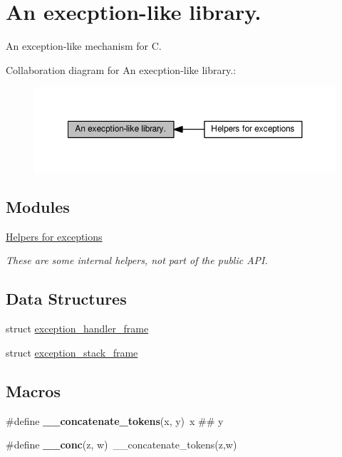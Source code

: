 \hypertarget{group__exceptions}{}\section{An execption-\/like library.}
\label{group__exceptions}


An exception-\/like mechanism for C.  


Collaboration diagram for An execption-\/like library.\+:
\nopagebreak
\begin{figure}[H]
\begin{center}
\leavevmode
\includegraphics[width=350pt]{group__exceptions}
\end{center}
\end{figure}
\subsection*{Modules}
\begin{DoxyCompactItemize}
\item 
\hyperlink{group__helpers}{Helpers for exceptions}
\begin{DoxyCompactList}\small\item\em These are some internal helpers, not part of the public A\+PI. \end{DoxyCompactList}\end{DoxyCompactItemize}
\subsection*{Data Structures}
\begin{DoxyCompactItemize}
\item 
struct \hyperlink{structexception__handler__frame}{exception\+\_\+handler\+\_\+frame}
\item 
struct \hyperlink{structexception__stack__frame}{exception\+\_\+stack\+\_\+frame}
\end{DoxyCompactItemize}
\subsection*{Macros}
\begin{DoxyCompactItemize}
\item 
\#define {\bfseries \+\_\+\+\_\+concatenate\+\_\+tokens}(x,  y)~x \#\# y\hypertarget{group__exceptions_gadf8cc03bd0ede7f3e5aafa57de5016dd}{}\label{group__exceptions_gadf8cc03bd0ede7f3e5aafa57de5016dd}

\item 
\#define {\bfseries \+\_\+\+\_\+conc}(z,  w)~\+\_\+\+\_\+concatenate\+\_\+tokens(z,w)\hypertarget{group__exceptions_ga0d2e02c74b05d3ff3bfa9eb3dcd891e3}{}\label{group__exceptions_ga0d2e02c74b05d3ff3bfa9eb3dcd891e3}

\end{DoxyCompactItemize}
